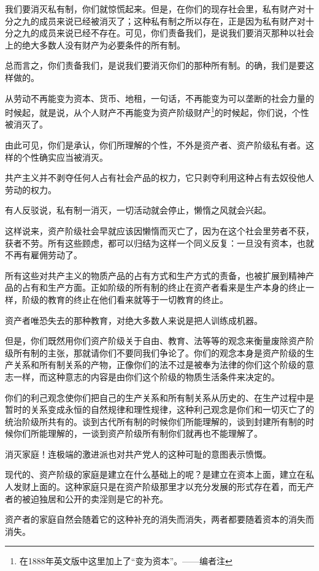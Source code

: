 \documentclass[UTF8,zihao=-4,a4paper]{ctexart}
\begin{document}
我们要消灭私有制，你们就惊慌起来。但是，在你们的现存社会里，私有财产对十分之九的成员来说已经被消灭了；这种私有制之所以存在，正是因为私有财产对十分之九的成员来说已经不存在。可见，你们责备我们，是说我们要消灭那种以社会上的绝大多数人没有财产为必要条件的所有制。\par
总而言之，你们责备我们，是说我们要消灭你们的那种所有制。的确，我们是要这样做的。\par
从劳动不再能变为资本、货币、地租，一句话，不再能变为可以垄断的社会力量的时候起，就是说，从个人财产不再能变为资产阶级财产\footnote{在1888年英文版中这里加上了“变为资本”。——编者注}的时候起，你们说，个性被消灭了。\par
由此可见，你们是承认，你们所理解的个性，不外是资产者、资产阶级私有者。这样的个性确实应当被消灭。\par
共产主义并不剥夺任何人占有社会产品的权力，它只剥夺利用这种占有去奴役他人劳动的权力。\par
有人反驳说，私有制一消灭，一切活动就会停止，懒惰之风就会兴起。\par
这样说来，资产阶级社会早就应该因懒惰而灭亡了，因为在这个社会里劳者不获，获者不劳。所有这些顾虑，都可以归结为这样一个同义反复：一旦没有资本，也就不再有雇佣劳动了。\par
所有这些对共产主义的物质产品的占有方式和生产方式的责备，也被扩展到精神产品的占有和生产方面。正如阶级的所有制的终止在资产者看来是生产本身的终止一样，阶级的教育的终止在他们看来就等于一切教育的终止。\par
资产者唯恐失去的那种教育，对绝大多数人来说是把人训练成机器。\par
但是，你们既然用你们资产阶级关于自由、教育、法等等的观念来衡量废除资产阶级所有制的主张，那就请你们不要同我们争论了。你们的观念本身是资产阶级的生产关系和所有制关系的产物，正像你们的法不过是被奉为法律的你们这个阶级的意志一样，而这种意志的内容是由你们这个阶级的物质生活条件来决定的。\par
你们的利己观念使你们把自己的生产关系和所有制关系从历史的、在生产过程中是暂时的关系变成永恒的自然规律和理性规律，这种利己观念是你们和一切灭亡了的统治阶级所共有的。谈到古代所有制的时候你们所能理解的，谈到封建所有制的时候你们所能理解的，一谈到资产阶级所有制你们就再也不能理解了。\par
消灭家庭！连极端的激进派也对共产党人的这种可耻的意图表示愤慨。\par
现代的、资产阶级的家庭是建立在什么基础上的呢？是建立在资本上面，建立在私人发财上面的。这种家庭只是在资产阶级那里才以充分发展的形式存在着，而无产者的被迫独居和公开的卖淫则是它的补充。\par
资产者的家庭自然会随着它的这种补充的消失而消失，两者都要随着资本的消失而消失。\par
\end{document}
